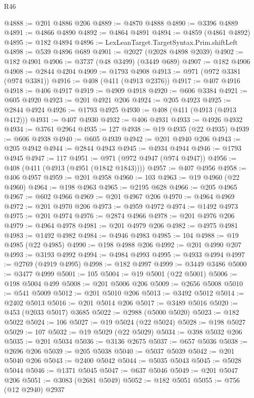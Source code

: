 \begin{lexlean}{R46}
\begin{coremodule}
@4888 := @201 @4886 @206
@4889 := @4870 @4888
@4890 := @3396 @4889
@4891 := @4866 @4890
@4892 := @4864 @4891
@4894 := @4859 (@4861 @4892)
@4895 := @182 @4894
@4896 := LexLeanTarget.TargetSyntax.Prim.shiftLeft
@4898 := @539 @4896 @689
@4901 := @2027 (@2028 @4898 @2039)
@4902 := @182 @4901
@4906 := @3737 (@48 @3499) (@3449 @689)
@4907 := @182 @4906
@4908 := @2844 @4204
@4909 := @1793 @4908
@4913 := @971 (@972 @3381 (@974 @3381))
@4916 := @408 (@411 (@4913 @2376))
@4917 := @407 @4916
@4918 := @406 @4917
@4919 := @4909 @4918
@4920 := @606 @3384
@4921 := @605 @4920
@4923 := @201 @4921 @206
@4924 := @205 @4923
@4925 := @2844 @4924
@4926 := @1793 @4925
@4930 := @408 (@411 (@4913 (@4913 @412)))
@4931 := @407 @4930
@4932 := @406 @4931
@4933 := @4926 @4932
@4934 := @3761 @2964
@4935 := 127
@4938 := @19 @4935 (@22 @4935)
@4939 := @606 @4938
@4940 := @605 @4939
@4942 := @201 @4940 @206
@4943 := @205 @4942
@4944 := @2844 @4943
@4945 := @4934 @4944
@4946 := @1793 @4945
@4947 := 117
@4951 := @971 (@972 @4947 (@974 @4947))
@4956 := @408 (@411 (@4913 (@4951 (@1842 @1843))))
@4957 := @407 @4956
@4958 := @406 @4957
@4959 := @201 @4958
@4960 := 103
@4963 := @19 @4960 (@22 @4960)
@4964 := @198 @4963
@4965 := @2195 @628
@4966 := @205 @4965
@4967 := @602 @4966
@4969 := @201 @4967 @206
@4970 := @4964 @4969
@4972 := @201 @4970 @206
@4973 := @4959 @4972
@4974 := @1492 @4973
@4975 := @201 @4974
@4976 := @2874 @4966
@4978 := @201 @4976 @206
@4979 := @4964 @4978
@4981 := @201 @4979 @206
@4982 := @4975 @4981
@4983 := @1492 @4982
@4984 := @4946 @4983
@4985 := 104
@4988 := @19 @4985 (@22 @4985)
@4990 := @198 @4988 @206
@4992 := @201 @4990 @207
@4993 := @3193 @4992
@4994 := @4984 @4993
@4995 := @4933 @4994
@4997 := @2769 (@4919 @4995)
@4998 := @182 @4997
@4999 := @3449 @3486
@5000 := @3477 @4999
@5001 := 105
@5004 := @19 @5001 (@22 @5001)
@5006 := @198 @5004 @499
@5008 := @201 @5006 @206
@5009 := @2656 @5008
@5010 := @541 @5009
@5012 := @201 @5010 @206
@5013 := @3492 @5012
@5014 := @2402 @5013
@5016 := @201 @5014 @206
@5017 := @3489 @5016
@5020 := @453 (@2033 @5017) @3685
@5022 := @2988 (@5000 @5020)
@5023 := @182 @5022
@5024 := 106
@5027 := @19 @5024 (@22 @5024)
@5028 := @198 @5027
@5029 := 107
@5032 := @19 @5029 (@22 @5029)
@5034 := @398 @5032 @206
@5035 := @201 @5034
@5036 := @3136 @2675
@5037 := @657 @5036
@5038 := @2696 @206
@5039 := @205 @5038
@5040 := @5037 @5039
@5042 := @201 @5040 @206
@5043 := @2400 @5042
@5044 := @5035 @5043
@5045 := @5028 @5044
@5046 := @1371 @5045
@5047 := @637 @5046
@5049 := @201 @5047 @206
@5051 := @3083 (@2681 @5049)
@5052 := @182 @5051
@5055 := @756 (@12 @2940) @2937

\end{coremodule}
\end{lexlean}
